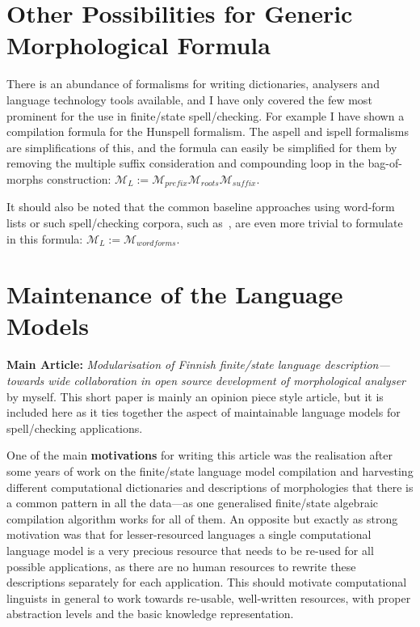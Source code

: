 \documentclass[officiallayout]{unihelcompling}
\begin{document}
\section{Other Possibilities for Generic Morphological Formula}
\label{sec:other-lms}

There is an abundance of formalisms for writing dictionaries, analysers and
language technology tools available, and I have only covered the few most
prominent for the use in finite\-/state spell\-/checking. For example I have
shown a compilation formula for the Hunspell formalism. The aspell and ispell
formalisms are simplifications of this, and the formula can easily be
simplified for them by removing the multiple suffix consideration and
compounding loop in the bag-of-morphs construction: $\mathcal{M}_L :=
\mathcal{M}_{prefix} \mathcal{M}_{roots} \mathcal{M}_{suffix}$.

It should also be noted that the common baseline approaches using word-form
lists or such spell\-/checking corpora, such as~\citet{norvig2010howto}, are even
more trivial to formulate in this formula: $\mathcal{M}_L :=
\mathcal{M}_{wordforms}$.

\section{Maintenance of the Language Models}
\label{sec:maintenance}

\textbf{Main Article:} \emph{Modularisation of Finnish finite\-/state language 
description—towards wide collaboration in open source development of
morphological analyser} by myself. This short paper is mainly an opinion
piece style article, but it is included here as it ties together the
aspect of maintainable language models for spell\-/checking applications.

One of the main \textbf{motivations} for writing this article was the
realisation after some years of work on the finite\-/state language model
compilation and harvesting different computational dictionaries and
descriptions of morphologies that there is a common pattern in all the
data---as one generalised finite\-/state algebraic compilation algorithm works
for all of them. An opposite but exactly as strong motivation was that for
lesser-resourced languages a single computational language model is a very
precious resource that needs to be re-used for all possible applications, as
there are no human resources to rewrite these descriptions separately for each
application. This should motivate computational linguists in general to work
towards re-usable, well-written resources, with proper abstraction levels and
the basic knowledge representation.
\end{document}
